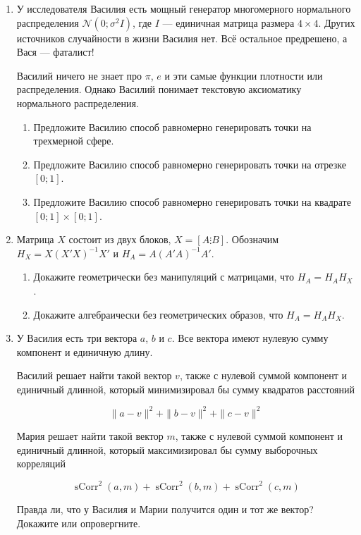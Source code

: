 \documentclass[12pt]{article} %
\theoremstyle{definition} %
\DeclareMathOperator{\sCorr}{sCorr}
\def \cN{\mathcal{N}}
\begin{document}
\begin{enumerate}
\item У исследователя Василия есть мощный генератор многомерного нормального распределения
$\cN(0;\sigma^2 I)$, где $I$ — единичная матрица размера $4\times 4$. 
Других источников случайности в жизни Василия нет. Всё остальное предрешено, а Вася — фаталист!

Василий ничего не знает про $\pi$, $e$ и эти самые функции плотности или распределения.
Однако Василий понимает текстовую аксиоматику нормального распределения. 

\begin{enumerate}
\item Предложите Василию способ равномерно генерировать точки на трехмерной сфере.
\item Предложите Василию способ равномерно генерировать точки на отрезке $[0;1]$.
\item Предложите Василию способ равномерно генерировать точки на квадрате $[0;1]\times [0;1]$.
\end{enumerate}


\item Матрица $X$ состоит из двух блоков, $X = [A \vdots B]$. Обозначим
$H_X = X(X'X)^{-1}X'$ и $H_A = A(A'A)^{-1}A'$. 

\begin{enumerate}
    \item Докажите геометрически без манипуляций с матрицами, что $H_A = H_A H_X$.
    \item Докажите алгебраически без геометрических образов, что $H_A = H_A H_X$.
\end{enumerate}


\item У Василия есть три вектора $a$, $b$ и $c$. 
Все вектора имеют нулевую сумму компонент и единичную длину. 

Василий решает найти такой вектор $v$, также с нулевой суммой компонент и единичный длинной, 
который минимизировал бы сумму квадратов расстояний 

\[
    \|a - v\|^2 + \|b - v\|^2 + \|c - v\|^2
\]

Мария решает найти такой вектор $m$, также с нулевой суммой компонент и единичный длинной,
который максимизировал бы сумму выборочных корреляций

\[
\sCorr^2(a, m) +   \sCorr^2(b, m) +\sCorr^2(c, m) 
\]


Правда ли, что у Василия и Марии получится один и тот же вектор? 
Докажите или опровергните.



\end{enumerate}
\end{document}
